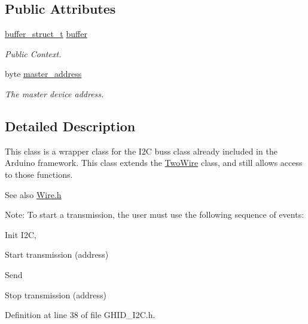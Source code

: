 \subsection*{\-Public \-Attributes}
\begin{DoxyCompactItemize}
\item 
\hyperlink{structbuffer__struct__t}{buffer\-\_\-struct\-\_\-t} \hyperlink{class_g_h_i_d___i2_c_a6722de3f1d85e1488ae667f6fb04c2a0}{buffer}
\begin{DoxyCompactList}\small\item\em \-Public \-Context. \end{DoxyCompactList}\item 
byte \hyperlink{class_g_h_i_d___i2_c_ab168a66728f51bbbd877d604ebb18492}{master\-\_\-address}
\begin{DoxyCompactList}\small\item\em \-The master device address. \end{DoxyCompactList}\end{DoxyCompactItemize}


\subsection{\-Detailed \-Description}
\-This class is a wrapper class for the \-I2\-C buss class already included in the \-Arduino framework. \-This class extends the \hyperlink{class_two_wire}{\-Two\-Wire} class, and still allows access to those functions.

\begin{DoxySeeAlso}{\-See also}
\hyperlink{_wire_8h}{\-Wire.\-h}
\end{DoxySeeAlso}
\-Note\-: \-To start a transmission, the user must use the following sequence of events\-:
\begin{DoxyItemize}
\item \-Init \-I2\-C,
\item \-Start transmission (address)
\item \-Send
\item \-Stop transmission (address) 
\end{DoxyItemize}

\-Definition at line 38 of file \-G\-H\-I\-D\-\_\-\-I2\-C.\-h.



